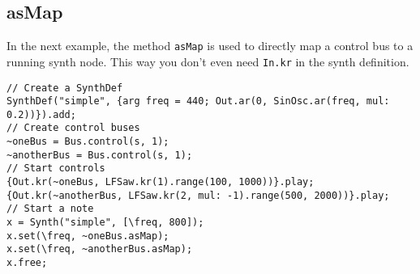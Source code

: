 \subsection{asMap}

In the next example, the method \texttt{asMap} is used to directly map a control bus to a running synth node. This way you don't even need \texttt{In.kr} in the synth definition.

\begin{lstlisting}[style=SuperCollider-IDE, basicstyle=\scttfamily\footnotesize]
// Create a SynthDef
SynthDef("simple", {arg freq = 440; Out.ar(0, SinOsc.ar(freq, mul: 0.2))}).add;
// Create control buses
~oneBus = Bus.control(s, 1);
~anotherBus = Bus.control(s, 1);
// Start controls
{Out.kr(~oneBus, LFSaw.kr(1).range(100, 1000))}.play;
{Out.kr(~anotherBus, LFSaw.kr(2, mul: -1).range(500, 2000))}.play;
// Start a note
x = Synth("simple", [\freq, 800]);
x.set(\freq, ~oneBus.asMap);
x.set(\freq, ~anotherBus.asMap);
x.free;
\end{lstlisting}

